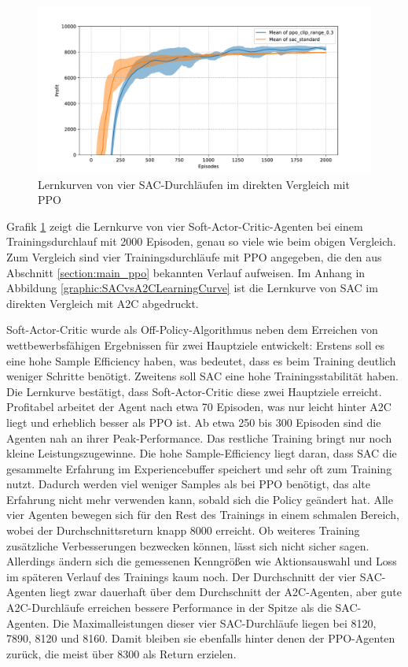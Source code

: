 \begin{figure}[htb]
	\centering
	\includegraphics[width=\textwidth]{main/ppo_vs_sac.pdf}
	\caption{Lernkurven von vier SAC-Durchläufen im direkten Vergleich mit PPO}
	\label{graphic:SACLearningCurve}
\end{figure}

Grafik \ref{graphic:SACLearningCurve} zeigt die Lernkurve von vier Soft-Actor-Critic-Agenten bei einem Trainingsdurchlauf mit 2000 Episoden, genau so viele wie beim obigen Vergleich.
Zum Vergleich sind vier Trainingsdurchläufe mit PPO angegeben, die den aus Abschnitt \ref{section:main_ppo} bekannten Verlauf aufweisen.
Im Anhang in Abbildung \ref{graphic:SACvsA2CLearningCurve} ist die Lernkurve von SAC im direkten Vergleich mit A2C abgedruckt.

Soft-Actor-Critic wurde als Off-Policy-Algorithmus neben dem Erreichen von wettbewerbsfähigen Ergebnissen für zwei Hauptziele entwickelt:
Erstens soll es eine hohe Sample Efficiency haben, was bedeutet, dass es beim Training deutlich weniger Schritte benötigt.
Zweitens soll SAC eine hohe Trainingsstabilität haben.
Die Lernkurve bestätigt, dass Soft-Actor-Critic diese zwei Hauptziele erreicht.
Profitabel arbeitet der Agent nach etwa 70 Episoden, was nur leicht hinter A2C liegt und erheblich besser als PPO ist.
Ab etwa 250 bis 300 Episoden sind die Agenten nah an ihrer Peak-Performance.
Das restliche Training bringt nur noch kleine Leistungszugewinne.
Die hohe Sample-Efficiency liegt daran, dass SAC die gesammelte Erfahrung im Experiencebuffer speichert und sehr oft zum Training nutzt.
Dadurch werden viel weniger Samples als bei PPO benötigt, das alte Erfahrung nicht mehr verwenden kann, sobald sich die Policy geändert hat.
Alle vier Agenten bewegen sich für den Rest des Trainings in einem schmalen Bereich, wobei der Durchschnittsreturn knapp 8000 erreicht.
Ob weiteres Training zusätzliche Verbesserungen bezwecken können, lässt sich nicht sicher sagen.
Allerdings ändern sich die gemessenen Kenngrößen wie Aktionsauswahl und Loss im späteren Verlauf des Trainings kaum noch.
Der Durchschnitt der vier SAC-Agenten liegt zwar dauerhaft über dem Durchschnitt der A2C-Agenten, aber gute A2C-Durchläufe erreichen bessere Performance in der Spitze als die SAC-Agenten.
Die Maximalleistungen dieser vier SAC-Durchläufe liegen bei 8120, 7890, 8120 und 8160.
Damit bleiben sie ebenfalls hinter denen der PPO-Agenten zurück, die meist über 8300 als Return erzielen.

